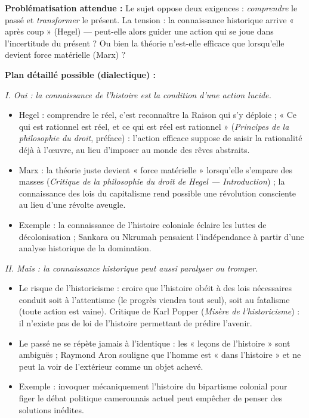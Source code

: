 \documentclass[11pt]{article}
\begin{document}
\begin{corrige}
\textbf{Problématisation attendue :} Le sujet oppose deux exigences : \emph{comprendre} le passé et \emph{transformer} le présent. La tension : la connaissance historique arrive « après coup » (Hegel) — peut-elle alors guider une action qui se joue dans l'incertitude du présent ? Ou bien la théorie n'est-elle efficace que lorsqu'elle devient force matérielle (Marx) ?

\textbf{Plan détaillé possible (dialectique) :}

\emph{I. Oui : la connaissance de l'histoire est la condition d'une action lucide.}
\begin{itemize}
\item Hegel : comprendre le réel, c'est reconnaître la Raison qui s'y déploie ; « Ce qui est rationnel est réel, et ce qui est réel est rationnel » (\emph{Principes de la philosophie du droit}, préface) : l'action efficace suppose de saisir la rationalité déjà à l'œuvre, au lieu d'imposer au monde des rêves abstraits.
\item Marx : la théorie juste devient « force matérielle » lorsqu'elle s'empare des masses (\emph{Critique de la philosophie du droit de Hegel — Introduction}) ; la connaissance des lois du capitalisme rend possible une révolution consciente au lieu d'une révolte aveugle.
\item Exemple : la connaissance de l'histoire coloniale éclaire les luttes de décolonisation ; Sankara ou Nkrumah pensaient l'indépendance à partir d'une analyse historique de la domination.
\end{itemize}

\emph{II. Mais : la connaissance historique peut aussi paralyser ou tromper.}
\begin{itemize}
\item Le risque de l'historicisme : croire que l'histoire obéit à des lois nécessaires conduit soit à l'attentisme (le progrès viendra tout seul), soit au fatalisme (toute action est vaine). Critique de Karl Popper (\emph{Misère de l'historicisme}) : il n'existe pas de loi de l'histoire permettant de prédire l'avenir.
\item Le passé ne se répète jamais à l'identique : les « leçons de l'histoire » sont ambiguës ; Raymond Aron souligne que l'homme est « dans l'histoire » et ne peut la voir de l'extérieur comme un objet achevé.
\item Exemple : invoquer mécaniquement l'histoire du bipartisme colonial pour figer le débat politique camerounais actuel peut empêcher de penser des solutions inédites.
\end{itemize}


\end{corrige}
\end{document}
